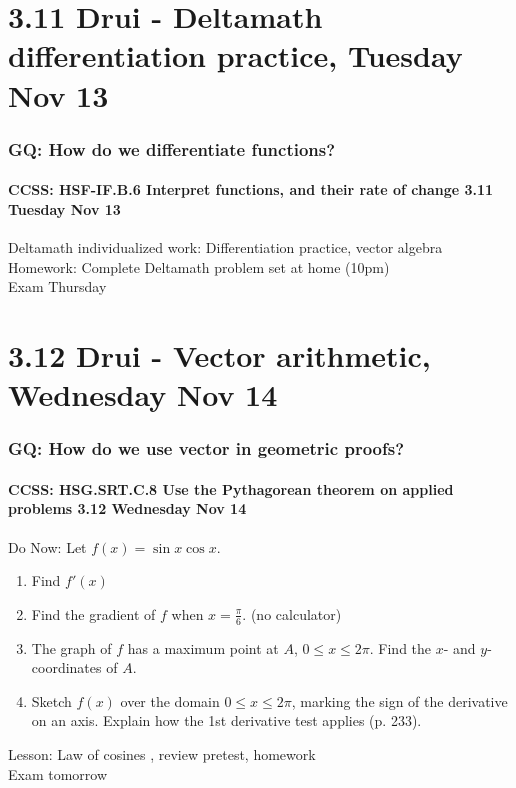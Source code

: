 \documentclass{beamer}
\begin{document}
\section{3.11 Drui - Deltamath differentiation practice, Tuesday Nov 13}
  \frame
  {
    \frametitle{GQ: How do we differentiate functions?}
    \framesubtitle{CCSS: HSF-IF.B.6 Interpret functions, and their rate of change  \alert{3.11 Tuesday Nov 13}}


    Deltamath individualized work: Differentiation practice, vector algebra \\ \bigskip
    Homework: Complete Deltamath problem set at home (10pm)\\
    \alert{Exam Thursday}
  }

\section{3.12 Drui - Vector arithmetic, Wednesday Nov 14}
  \frame
  {
    \frametitle{GQ: How do we use vector in geometric proofs?}
    \framesubtitle{CCSS: HSG.SRT.C.8 Use the Pythagorean theorem on applied problems \qquad \alert{3.12 Wednesday Nov 14}}

    \begin{block}{Do Now: Let $\displaystyle f(x)= \sin{x} \cos{x}$.}
    \begin{enumerate}
        \item Find $f'(x)$
        \item Find the gradient of $f$ when $x= \frac{\pi}{6}$. (no calculator)
        \item The graph of $f$ has a maximum point at $A$, $0 \leq x \leq 2\pi$. Find the $x$- and $y$-coordinates of $A$.
        \item Sketch $f(x)$ over the domain $0 \leq x \leq 2\pi$, marking the sign of the derivative on an axis. Explain how the 1st derivative test applies (p. 233).
    \end{enumerate}
    \end{block}

    Lesson: Law of cosines , review pretest, homework\\ \bigskip
    \alert{Exam tomorrow}
  }
\end{document}
